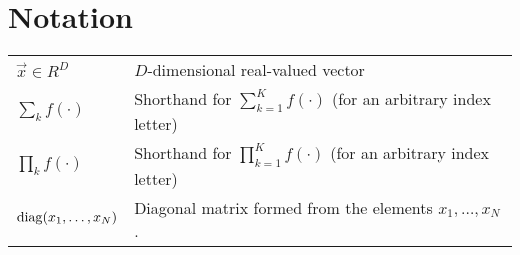 \chapter{Notation}
\begin{tabular}{ll}
    $\vec x \in R^D$                    & $D$-dimensional real-valued vector \\
    $\sum_k f(\cdot)$                   & Shorthand for $\sum_{k = 1}^K f(\cdot)$ (for an arbitrary index letter) \\
    $\prod_k f(\cdot)$                  & Shorthand for $\prod_{k = 1}^K f(\cdot)$ (for an arbitrary index letter) \\
    $\operatorname{diag}(x_1, \dotsc, x_N)$           & Diagonal matrix formed from the elements $x_1, \dotsc, x_N$.
\end{tabular}